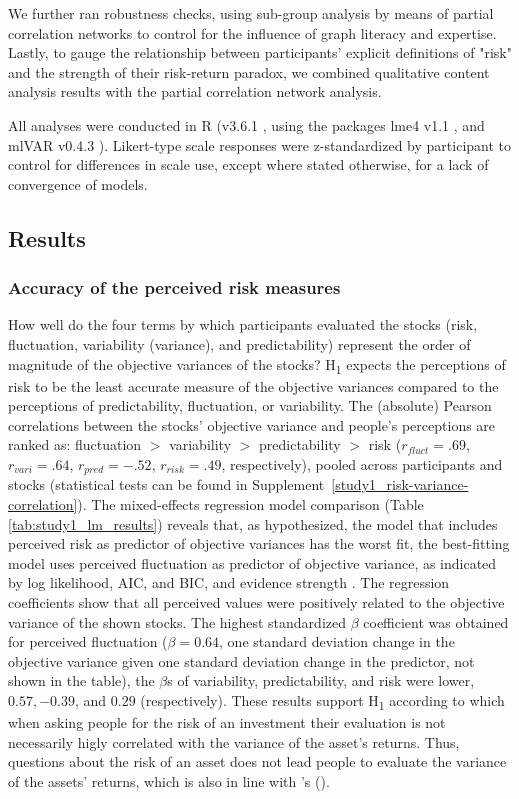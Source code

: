 \documentclass[a4paper,man, natbib,floatsintext]{apa6} %
\begin{document}
We further ran robustness checks, using sub-group analysis by means of partial correlation networks to control for the influence of graph literacy and expertise. Lastly, to gauge the relationship between participants' explicit definitions of "risk" and the strength of their risk-return paradox, we combined qualitative content analysis results with the partial correlation network analysis.

All analyses were conducted in R (v3.6.1 \citep{R}, using the packages lme4 v1.1 \citep{Bates2015}, and mlVAR v0.4.3 \citep{Epskamp2019}). Likert-type scale responses were z-standardized by participant to control for differences in scale use, except where stated otherwise, for a lack of convergence of models.

\subsection{Results}
\subsubsection{Accuracy of the perceived risk measures}
How well do the four terms by which participants evaluated the stocks (risk, fluctuation, variability (variance), and  predictability) represent the order of magnitude of the objective variances of the stocks? H\textsubscript{1} expects the perceptions of risk to be the least accurate measure of the objective variances compared to the perceptions of predictability, fluctuation, or variability. The (absolute) Pearson correlations between the stocks' objective variance and people's perceptions are ranked as: fluctuation $>$ variability $>$ predictability $>$ risk ($r_{fluct}=.69$, $r_{vari}=.64$, $r_{pred}= -.52$, $r_{risk}= .49$, respectively), pooled across participants and stocks (statistical tests can be found in Supplement~\ref{study1_risk-variance-correlation}). The mixed-effects regression model comparison (Table \ref{tab:study1_lm_results}) reveals that, as hypothesized, the model that includes perceived risk as predictor of objective variances has the worst fit, the best-fitting model uses perceived fluctuation as predictor of objective variance, as indicated by log likelihood, AIC, and BIC, and evidence strength \citep[the best model has an AIC weight of 1, see][]{Wagenmakers2004}. The regression coefficients show that all perceived values were positively related to the objective variance of the shown stocks. The highest standardized $\beta$ coefficient was obtained for perceived fluctuation ($\beta = 0.64$, one standard deviation change in the objective variance given one standard deviation change in the predictor, not shown in the table), the $\beta$s of variability, predictability, and risk were lower, $ 0.57, -0.39$, and $0.29$ (respectively). These results support H\textsubscript{1} according to which when asking people for the risk of an investment their evaluation is not necessarily higly correlated with the variance of the asset's returns. Thus, questions about the risk of an asset does not lead people to evaluate the variance of the assets' returns, which is also in line with \citeauthor{Klos2005a}'s (\citeyear{Klos2005a}).
\end{document}
